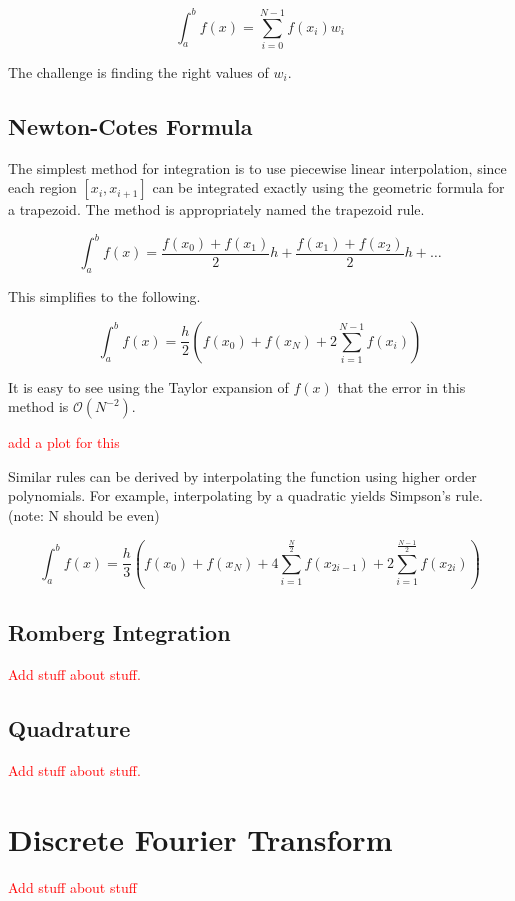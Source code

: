 \documentclass[12pt,letterpaper]{article}
\numberwithin{equation}{section}
\newcommand{\beq}{\begin{equation}}
\newcommand{\eeq}{\end{equation}}
\begin{document}
\beq
\int_{a}^{b}f(x) = \sum_{i=0}^{N-1}f(x_i)w_i
\eeq

The challenge is finding the right values of $w_i$.

\subsection{Newton-Cotes Formula}
The simplest method for integration is to use piecewise linear interpolation, since each region $[x_i,x_{i+1}]$ can be integrated exactly using the geometric formula for a trapezoid. The method is appropriately named the trapezoid rule.

\beq
\int_{a}^{b}f(x) = \frac{f(x_0)+f(x_1)}{2}h + \frac{f(x_1)+f(x_2)}{2}h + \dots
\eeq

\noindent This simplifies to the following.

\beq
\int_{a}^{b}f(x) = \frac{h}{2}(f(x_0)+f(x_N) + 2\sum_{i=1}^{N-1}f(x_i))
\eeq

It is easy to see using the Taylor expansion of $f(x)$ that the error in this method is $\mathcal{O}(N^{-2})$.

\begin{center}
\textcolor{red}{add a plot for this}
\end{center}

Similar rules can be derived by interpolating the function using higher order polynomials. For example, interpolating by a quadratic yields Simpson's rule. (note: N should be even)

\beq
\int_{a}^{b}f(x) = \frac{h}{3}(f(x_0)+f(x_N) + 4\sum_{i=1}^{\frac{N}{2}}f(x_{2i-1}) + 2\sum_{i=1}^{\frac{N - 1}{2}}f(x_{2i}))
\eeq

\subsection{Romberg Integration}
\begin{center}
\textcolor{red}{Add stuff about stuff.}
\end{center}

\subsection{Quadrature}
\begin{center}
\textcolor{red}{Add stuff about stuff.}
\end{center}

\section{Discrete Fourier Transform}
\textcolor{red}{Add stuff about stuff}
\end{document}
